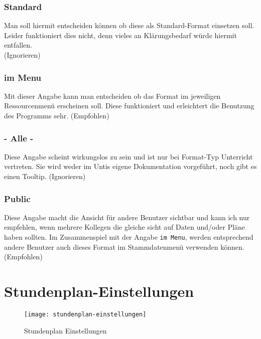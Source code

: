 \subsubsection{Standard}
Man soll hiermit entscheiden können ob diese als Standard-Format einsetzen soll. Leider funktioniert dies nicht, denn vieles an Klärungsbedarf würde hiermit entfallen.\\ (Ignorieren)

\subsubsection{im Menu}
Mit dieser Angabe kann man entscheiden ob das Format im jeweiligen Ressourcenmenü erscheinen soll. Diese funktioniert und erleichtert die Benutzung des Programms sehr. (Empfohlen)\\

\subsubsection{- Alle -}
Diese Angabe scheint wirkungslos zu sein und ist nur bei Format-Typ Unterricht vertreten. Sie wird weder im Untis eigene Dokumentation vorgeführt, noch gibt es einen Tooltip. (Ignorieren)\\

\subsubsection{Public}
Diese Angabe macht die Ansicht für andere Benutzer sichtbar und kann ich nur empfehlen, wenn mehrere Kollegen die gleiche sicht auf Daten und/oder Pläne haben sollten. Im Zusammenspiel mit der Angabe \texttt{im Menu}, werden entsprechend andere Benutzer auch dieses Format im Stammdatenmenü verwenden können. (Empfohlen)\\

\section{Stundenplan-Einstellungen}
\label{sec:stundenplan-einstellungen}

\begin{wrapfigure}{r}{0.4\textwidth}
	\vspace{-14pt}
	\centering
	\texttt{[image: stundenplan-einstellungen]}
	\vspace{-5pt}
	\caption{Stundenplan Einstellungen}
	\label{fig:stundenplan-einstellungen}
	\vspace{-50pt}
\end{wrapfigure}

